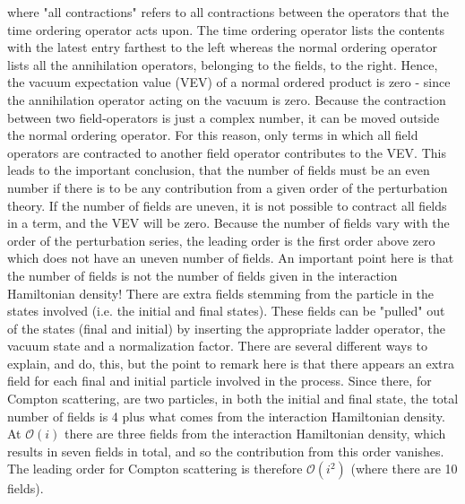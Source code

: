 \begin{example}
	where "all contractions" refers to all contractions between the operators that the time ordering operator acts upon. The time ordering operator lists the contents with the latest entry farthest to the left whereas the normal ordering operator lists all the annihilation operators, belonging to the fields, to the right. Hence, the vacuum expectation value (VEV) of a normal ordered product is zero - since the annihilation operator acting on the vacuum is zero. Because the contraction between two field-operators is just a complex number, it can be moved outside the normal ordering operator. For this reason, only terms in which all field operators are contracted to another field operator contributes to the VEV. This leads to the important conclusion, that the number of fields must be an even number if there is to be any contribution from a given order of the perturbation theory. If the number of fields are uneven, it is not possible to contract all fields in a term, and the VEV will be zero. Because the number of fields vary with the order of the perturbation series, the leading order is the first order above zero which does not have an uneven number of fields. An important point here is that the number of fields is not the number of fields given in the interaction Hamiltonian density! There are extra fields stemming from the particle in the states involved (i.e. the initial and final states). These fields can be "pulled" out of the states (final and initial) by inserting the appropriate ladder operator, the vacuum state and a normalization factor. There are several different ways to explain, and do, this, but the point to remark here is that there appears an extra field for each final and initial particle involved in the process. Since there, for Compton scattering, are two particles, in both the initial and final state, the total number of fields is 4 plus what comes from the interaction Hamiltonian density. At $\mathcal{O}(i)$ there are three fields from the interaction Hamiltonian density, which results in seven fields in total, and so the contribution from this order vanishes. The leading order for Compton scattering is therefore $\mathcal{O}(i^2)$ (where there are 10 fields). 
	
\end{example}

